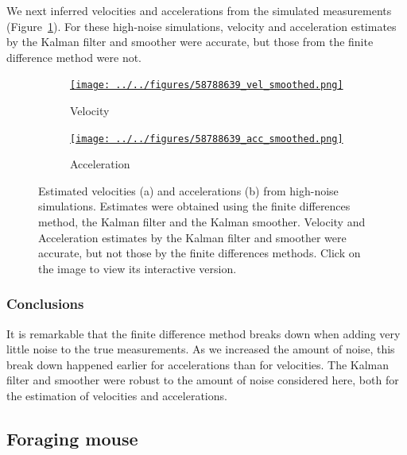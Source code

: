 \documentclass[12pt]{article}
\begin{document}
We next inferred velocities and accelerations from the simulated measurements
(Figure~\ref{fig:vel_acc_high_noise}).  For these high-noise simulations,
velocity and acceleration estimates by the Kalman filter and smoother were
accurate, but those from the finite difference method were not.

\begin{figure}

    \begin{subfigure}{\textwidth}
        \centering
        \href{http://www.gatsby.ucl.ac.uk/~rapela/fwg/lds_repo/inference/figures/58788639_vel_smoothed.html}{\texttt{[image: ../../figures/58788639\_vel\_smoothed.png]}}
        \caption{Velocity}
    \end{subfigure}

    \begin{subfigure}{\textwidth}
        \centering
        \href{http://www.gatsby.ucl.ac.uk/~rapela/fwg/lds_repo/inference/figures/58788639_acc_smoothed.html}{\texttt{[image: ../../figures/58788639\_acc\_smoothed.png]}}
        \caption{Acceleration}
    \end{subfigure}

    \caption{Estimated velocities (a) and accelerations (b) from high-noise
    simulations.  Estimates were obtained using the finite differences method,
    the Kalman filter and the Kalman smoother. Velocity and Acceleration
    estimates by the Kalman filter and smoother were accurate, but not those by
    the finite differences methods. Click on the image to view its interactive
    version.}

    \label{fig:vel_acc_high_noise}

\end{figure}

\subsubsection{Conclusions}

It is remarkable that the finite difference method breaks down when adding very
little noise to the true measurements. As we increased the amount of noise,
this break down happened earlier for accelerations than for velocities.
%
The Kalman filter and smoother were robust to the amount of noise considered
here, both for the estimation of velocities and accelerations.

\subsection{Foraging mouse}
\end{document}

